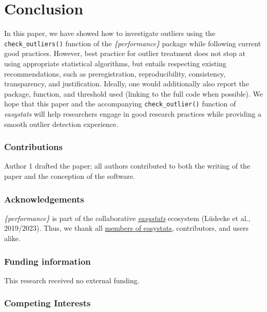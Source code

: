 \documentclass{article}
\begin{document}
\hypertarget{conclusion}{%
\section{Conclusion}\label{conclusion}}

In this paper, we have showed how to investigate outliers using the
\texttt{check\_outliers()} function of the \emph{\{performance\}}
package while following current good practices. However, best practice
for outlier treatment does not stop at using appropriate statistical
algorithms, but entails respecting existing recommendations, such as
preregistration, reproducibility, consistency, transparency, and
justification. Ideally, one would additionally also report the package,
function, and threshold used (linking to the full code when possible).
We hope that this paper and the accompanying \texttt{check\_outlier()}
function of \emph{easystats} will help researchers engage in good
research practices while providing a smooth outlier detection
experience.

\hypertarget{contributions}{%
\subsubsection{Contributions}\label{contributions}}

Author 1 drafted the paper; all authors contributed to both the writing
of the paper and the conception of the software.

\hypertarget{acknowledgements}{%
\subsubsection{Acknowledgements}\label{acknowledgements}}

\emph{\{performance\}} is part of the collaborative
\href{https://github.com/easystats/easystats}{\emph{easystats}}
ecosystem (Lüdecke et al., 2019/2023). Thus, we thank all
\href{https://github.com/orgs/easystats/people}{members of easystats},
contributors, and users alike.

\hypertarget{funding-information}{%
\subsubsection{Funding information}\label{funding-information}}

This research received no external funding.

\hypertarget{competing-interests}{%
\subsubsection{Competing Interests}\label{competing-interests}}
\end{document}
